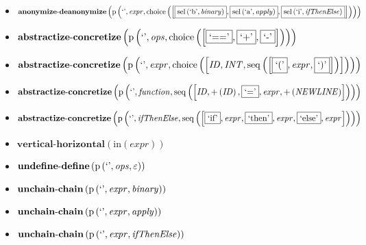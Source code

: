 {\begin{itemize}
\item $\mathbf{anonymize\text{-}deanonymize}\\\left(\mathrm{p}\left(\text{`'},\mathit{expr},\mathrm{choice}\left(\left[\fbox{$\mathrm{sel}\left(\text{`b'},\mathit{binary}\right)$}, \fbox{$\mathrm{sel}\left(\text{`a'},\mathit{apply}\right)$}, \fbox{$\mathrm{sel}\left(\text{`i'},\mathit{ifThenElse}\right)$}\right]\right)\right)\right)$
\item $\mathbf{abstractize\text{-}concretize}\\\left(\mathrm{p}\left(\text{`'},\mathit{ops},\mathrm{choice}\left(\left[\fbox{$\text{`=='}$}, \fbox{$\text{`+'}$}, \fbox{$\text{`-'}$}\right]\right)\right)\right)$
\item $\mathbf{abstractize\text{-}concretize}\\\left(\mathrm{p}\left(\text{`'},\mathit{expr},\mathrm{choice}\left(\left[\mathit{ID}, \mathit{INT}, \mathrm{seq}\left(\left[\fbox{$\text{`('}$}, \mathit{expr}, \fbox{$\text{`)'}$}\right]\right)\right]\right)\right)\right)$
\item $\mathbf{abstractize\text{-}concretize}\\\left(\mathrm{p}\left(\text{`'},\mathit{function},\mathrm{seq}\left(\left[\mathit{ID}, {+}\left(\mathit{ID}\right), \fbox{$\text{`='}$}, \mathit{expr}, {+}\left(\mathit{NEWLINE}\right)\right]\right)\right)\right)$
\item $\mathbf{abstractize\text{-}concretize}\\\left(\mathrm{p}\left(\text{`'},\mathit{ifThenElse},\mathrm{seq}\left(\left[\fbox{$\text{`if'}$}, \mathit{expr}, \fbox{$\text{`then'}$}, \mathit{expr}, \fbox{$\text{`else'}$}, \mathit{expr}\right]\right)\right)\right)$
\item $\mathbf{vertical\text{-}horizontal}\left(\mathrm{in}(expr)\right)$
\item $\mathbf{undefine\text{-}define}\\\left(\mathrm{p}\left(\text{`'},\mathit{ops},\varepsilon\right)\right)$
\item $\mathbf{unchain\text{-}chain}\\\left(\mathrm{p}\left(\text{`'},\mathit{expr},\mathit{binary}\right)\right)$
\item $\mathbf{unchain\text{-}chain}\\\left(\mathrm{p}\left(\text{`'},\mathit{expr},\mathit{apply}\right)\right)$
\item $\mathbf{unchain\text{-}chain}\\\left(\mathrm{p}\left(\text{`'},\mathit{expr},\mathit{ifThenElse}\right)\right)$

\end{itemize}}
